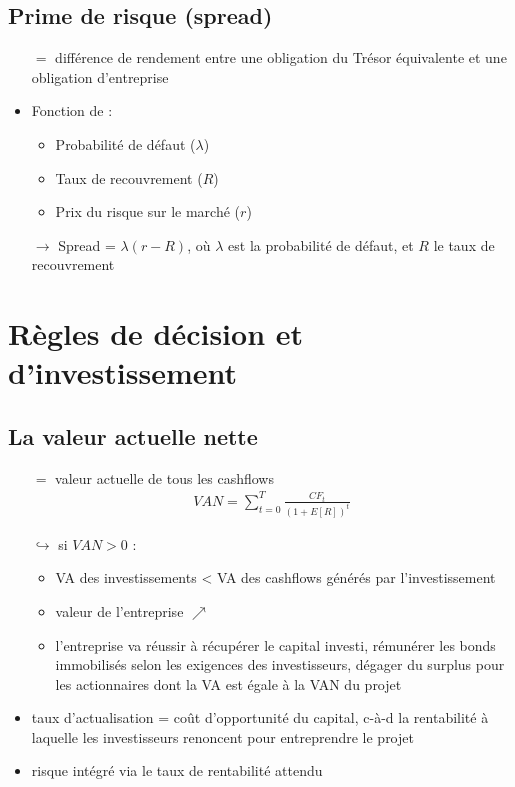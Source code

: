 \section{Prime de risque (spread)}

\begin{itemize}
    \item[$=$] différence de rendement entre une obligation du Trésor équivalente et une obligation d'entreprise
    \item Fonction de :
    \begin{itemize}
        \item Probabilité de défaut ($\lambda$)
        \item Taux de recouvrement ($R$)
        \item Prix du risque sur le marché ($r$)
    \end{itemize}
    \item[$\rightarrow$] Spread = $\lambda (r - R)$, où $\lambda$ est la probabilité de défaut, et $R$ le taux de recouvrement
\end{itemize}

\chapter{Règles de décision et d'investissement}

\section{La valeur actuelle nette}

\begin{itemize}
    \item[$=$] valeur actuelle de tous les cashflows
    \begin{align*}
        VAN = \sum_{t=0}^T \frac{CF_t}{(1 + E[R])^t}
    \end{align*}
    \item[$\hookrightarrow$] si $VAN > 0$ :
    \begin{itemize}
        \item VA des investissements < VA des cashflows générés par l'investissement
        \item valeur de l'entreprise $\nearrow$
        \item l'entreprise va réussir à récupérer le capital investi, rémunérer les bonds immobilisés selon les exigences des investisseurs, dégager du surplus pour les actionnaires dont la VA est égale à la VAN du projet
    \end{itemize}
    \item taux d'actualisation = coût d'opportunité du capital, c-à-d la rentabilité à laquelle les investisseurs renoncent pour entreprendre le projet
    \item risque intégré via le taux de rentabilité attendu
\end{itemize}

